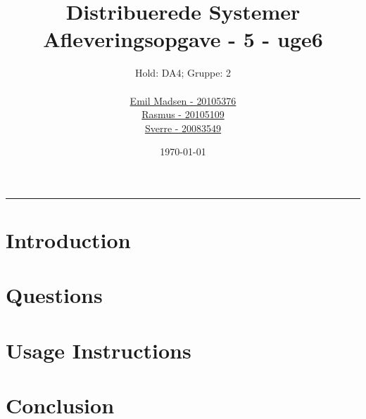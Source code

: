 \title{\huge Distribuerede Systemer \\
       \small Afleveringsopgave - 5 - uge6 }
\author{Hold: DA4; Gruppe: 2\\ \\
        \href{mailto:skeen@cs.au.dk}{Emil Madsen - 20105376}\\
        \href{mailto:emray@cs.au.dk}{Rasmus - 20105109}\\
        \href{mailto:sverre@cs.au.dk}{Sverre - 20083549}
       }
\date{\today}

\maketitle

\hrule

\section*{Introduction}
    

\section*{Questions}
    

\section*{Usage Instructions}
    

\section*{Conclusion}
    
